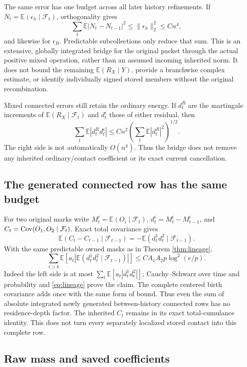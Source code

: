 \documentclass[11pt,letterpaper]{article}
\theoremstyle{remark}\newtheorem{remark}[theorem]{Remark}
\newcommand{\E}{\mathbb E}
\newcommand{\abs}[1]{\left\lvert#1\right\rvert}
\newcommand{\cF}{\mathcal F}
\begin{document}
The same error has one budget across all later history refinements. If
\(N_t=\E(\epsilon_h\mid\cF_t)\), orthogonality gives
\[
 \sum_t\E|N_t-N_{t-1}|^2\le\|\epsilon_h\|_2^2\le Cn^4,
\]
and likewise for \(\epsilon_R\). Predictable subcollections only reduce that sum. This is an extensive, globally integrated bridge for the original packet through the actual positive mixed operation, rather than an assumed incoming inherited norm. It does not bound the remaining \(\E(R_X\mid Y)\), provide a branchwise complex estimate, or identify individually signed stored members without the original recombination.

Mixed connected errors still retain the ordinary energy. If \(d_t^R\) are the martingale increments of \(\E(R_X\mid\cF_t)\) and \(d_t^\epsilon\) those of either residual, then
\[
 \sum_t\E|d_t^R d_t^\epsilon|
 \le Cn^2\left(\sum_t\E|d_t^R|^2\right)^{1/2}.
\]
The right side is not automatically \(O(n^4)\). Thus the bridge does not remove any inherited ordinary/contact coefficient or its exact current cancellation.

\subsection{The generated connected row has the same budget}

For two original marks write \(M_t^i=\E(O_i\mid\cF_t)\),
\(d_t^i=M_t^i-M_{t-1}^i\), and
\(C_t=\Cov(O_1,O_2\mid\cF_t)\). Exact total covariance gives
\[
 \E(C_t-C_{t-1}\mid\cF_{t-1})
 =-\E(d_t^1d_t^2\mid\cF_{t-1}).
\]
With the same predictable owned masks as in Theorem \ref{thm:lineage},
\begin{equation}\label{eq:generated}
 \boxed{\quad
 \sum_{t>b}\E\!\left[
 a_t\abs{\E(d_t^1d_t^2\mid\cF_{t-1})}\right]
 \le CA_1A_2p\log^2(e/p).
 \quad}
\end{equation}
Indeed the left side is at most
\(\sum_t\E[a_t|d_t^1d_t^2|]\); Cauchy--Schwarz over time and probability and \eqref{eq:lineage} prove the claim. The complete centered birth covariance adds once with the same form of bound.
Thus even the sum of absolute integrated newly generated between-history connected rows has no residence-depth factor. The inherited \(C_t\) remains in its exact total-cumulance identity. This does not turn every separately localized stored contact into this complete row.

\subsection{Raw mass and saved coefficients}
\end{document}
